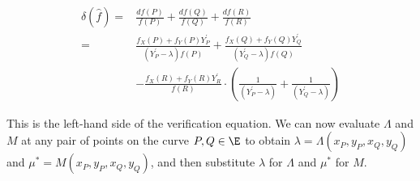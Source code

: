\documentclass[11pt,letterpaper]{article}
\theoremstyle{definition}
\newcommand{\6}{\mathbf}
\newcommand{\7}{\mathcal}
\begin{document}
\begin{align}
\delta(\widehat{f}) =& \frac{df(P)}{f(P)} + \frac{df(Q)}{f(Q)} + \frac{df(R)}{f(R)}  \nonumber \\
=& \frac{f_X(P) + f_Y(P)Y_P^\prime}{(Y_P^\prime - \lambda)f(P)} + \frac{f_X(Q) + f_Y(Q)Y_Q^\prime}{(Y_Q^\prime - \lambda)f(Q)} \nonumber  \\& - \frac{f_X(R) + f_Y(R)Y_R^\prime}{f(R)} \cdot \left(\frac{1}{(Y_P^\prime - \lambda)} + \frac{1}{(Y_Q^\prime - \lambda)}\right) 
\label{deltafhat}
\end{align}



This is the left-hand side of the verification equation. We can now evaluate $\Lambda$ and $M$ at any pair of points on the curve $P, Q \in \E$ to obtain $\lambda = \Lambda(x_P,y_P, x_Q, y_Q)$ and $\mu^* = M(x_P, y_P, x_Q, y_Q)$, and then substitute $\lambda$ for $\Lambda$ and $\mu^*$ for $M$.
\end{document}
